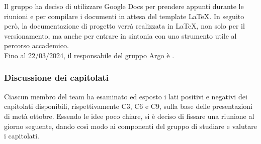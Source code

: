 Il gruppo ha deciso di utilizzare Google Docs per prendere appunti durante le riunioni e per compilare i documenti in attesa del template LaTeX. In seguito però, la documentazione di progetto verrà realizzata in LaTeX, non solo per il versionamento, ma anche per entrare in sintonia con uno strumento utile al percorso accademico.\\
Fino al 22/03/2024, il responsabile del gruppo Argo è \sebastiano.

\subsubsection{Discussione dei capitolati}
Ciascun membro del team ha esaminato ed esposto i lati positivi e negativi dei capitolati disponibili, rispettivamente C3, C6 e C9, sulla base delle presentazioni di metà ottobre. Essendo le idee poco chiare, si è deciso di fissare una riunione al giorno seguente, dando così modo ai componenti del gruppo di studiare e valutare i capitolati.

\clearpage
